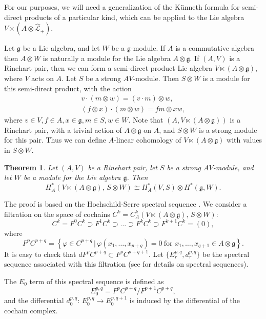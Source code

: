 \documentclass[12pt]{amsart}
\newcommand{\g}{{\mathfrak{g}}}
\renewcommand{\L}{{\mathcal{L}}}
\newcommand{\vphi}{{\varphi}}
\newtheorem{theorem}{Theorem}[section]
\theoremstyle{definition}
\begin{document}
For our purposes, we will need a generalization of the K\"unneth formula for semi-direct products of a particular kind, which can be applied to the Lie algebra
$V \ltimes (A \otimes \widehat{\L}_+)$. 

Let $\g$ be a Lie algebra, and let $W$ be a $\g$-module. If $A$ is a commutative algebra then $A \otimes W$ is naturally a module for the Lie algebra 
$A \otimes \g$. If $(A,V)$ is a Rinehart pair, then we can form a semi-direct product Lie algebra  $V \ltimes (A \otimes \g)$, where $V$ acts on $A$. 
Let $S$ be a strong $AV$-module.
Then $S \otimes W$ is a module for this semi-direct product, with the action
\begin{align*}
v \cdot (m \otimes w) = (v \cdot m) \otimes w, \\
(f \otimes x) \cdot (m \otimes w) = fm \otimes xw,
\end{align*}
where $v \in V, f \in A, x \in \g, m \in S, w \in W$.
Note that $(A, V \ltimes (A \otimes \g))$ is a Rinehart pair, with a trivial action of $A \otimes \g$ on $A$, and $S \otimes W$ is a strong module for this pair. Thus we can define $A$-linear cohomology of $V \ltimes (A \otimes \g)$ with values in $S \otimes W$.

\begin{theorem}
\label{semidirect_Kunneth}
Let $(A, V)$ be a Rinehart pair, let $S$ be a strong $AV$-module, and let $W$ be a module for the Lie algebra $\g$. Then
\[
H^*_A (V \ltimes (A \otimes \g),\, S \otimes W) \cong H^*_A (V, S) \otimes H^*(\g, W).
\]
\end{theorem}

The proof is based on the Hochschild-Serre spectral sequence \cite{HochschildSerre1953}. We consider a filtration on the space of cochains $C^k = C^k_A (V \ltimes (A \otimes \g),\, S \otimes W)$:
\[
C^k = F^0 C^k \supset F^1 C^k \supset \ldots \supset F^k C^k \supset F^{k+1} C^k = (0),  
\]
where 
\[
F^pC^{p+q} = \left\{ \vphi \in C^{p+q} \, \big| \, \vphi(x_1, \ldots, x_{p+q}) = 0 \ \text{for } x_1, \ldots, x_{q+1} \in A \otimes \g \right\}.
\]
It is easy to check that $d F^pC^{p+q} \subset F^pC^{p+q+1}$.
Let $\{ E_r^{p,q}, d_r^{p,q} \}$ be the spectral sequence associated with this
filtration (see \cite{McCleary2001} for details on spectral sequences).

The $E_0$ term of this spectral sequence is defined as
\[
E_0^{p,q} = F^pC^{p+q} / F^{p+1}C^{p+q},
\]
and the differential $d_0^{p,q} : \, E_0^{p,q} \rightarrow E_0^{p,q+1}$ is induced by the differential of the cochain complex.
\end{document}
